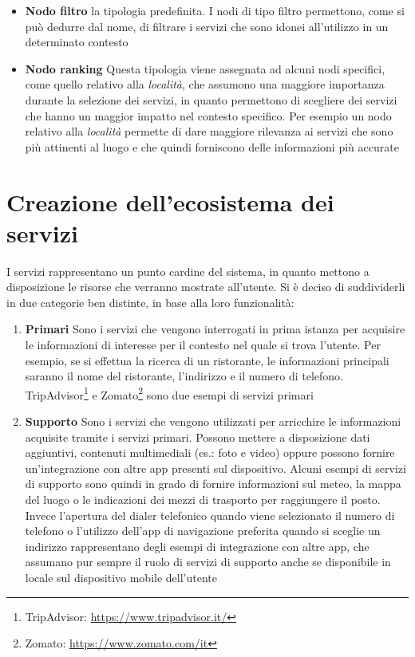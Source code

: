 \begin{itemize}
	\item \textbf{Nodo filtro}
	\upe la tipologia predefinita. I nodi di tipo filtro permettono, come si può dedurre dal nome, di filtrare i servizi che sono idonei all'utilizzo in un determinato contesto
	\item \textbf{Nodo ranking}
	Questa tipologia viene assegnata ad alcuni nodi specifici, come quello relativo alla \emph{località}, che assumono una maggiore importanza durante la selezione dei servizi, in quanto permettono di scegliere dei servizi che hanno un maggior impatto nel contesto specifico. Per esempio un nodo relativo alla \emph{località} permette di dare maggiore rilevanza ai servizi che sono più attinenti al luogo e che quindi forniscono delle informazioni più accurate
\end{itemize}

\section{Creazione dell'ecosistema dei servizi\label{sec:ecosistema-servizi}}

I servizi rappresentano un punto cardine del sistema, in quanto mettono a disposizione le risorse che verranno mostrate all'utente. Si è deciso di suddividerli in due categorie ben distinte, in base alla loro funzionalità:

\begin{enumerate}
	\item \textbf{Primari}
	Sono i servizi che vengono interrogati in prima istanza per acquisire le informazioni di interesse per il contesto nel quale si trova l'utente. Per esempio, se si effettua la ricerca di un ristorante, le informazioni principali saranno il nome del ristorante, l'indirizzo e il numero di telefono. TripAdvisor\footnote{TripAdvisor: \url{https://www.tripadvisor.it/}} e Zomato\footnote{Zomato: \url{https://www.zomato.com/it}} sono due esempi di servizi primari
	\item \textbf{Supporto}
	Sono i servizi che vengono utilizzati per arricchire le informazioni acquisite tramite i servizi primari. Possono mettere a disposizione dati aggiuntivi, contenuti multimediali (es.: foto e video) oppure possono fornire un'integrazione con altre app presenti sul dispositivo. Alcuni esempi di servizi di supporto sono quindi in grado di fornire informazioni sul meteo, la mappa del luogo o le indicazioni dei mezzi di trasporto per raggiungere il posto. Invece l'apertura del dialer telefonico quando viene selezionato il numero di telefono o l'utilizzo dell'app di navigazione preferita quando si sceglie un indirizzo rappresentano degli esempi di integrazione con altre app, che assumano pur sempre il ruolo di servizi di supporto anche se disponibile in locale sul dispositivo mobile dell'utente
\end{enumerate}

